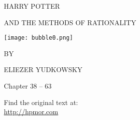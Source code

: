 



\begin{center}
\thispagestyle{empty}
{\hp
\Huge\MakeUppercase{Harry Potter}\vspace*{0.5cm}

\Large\MakeUppercase{and the Methods of Rationality} %
 
\texttt{[image: bubble0.png]} 

\Large BY \vspace*{.25cm}

\huge ELIEZER YUDKOWSKY%

\normalsize

\vspace*{1\baselineskip}
}

Chapter 38 -- 63

\vspace{3cm}
Find the original text at:\\
\url{http://hpmor.com} \\

\end{center}

